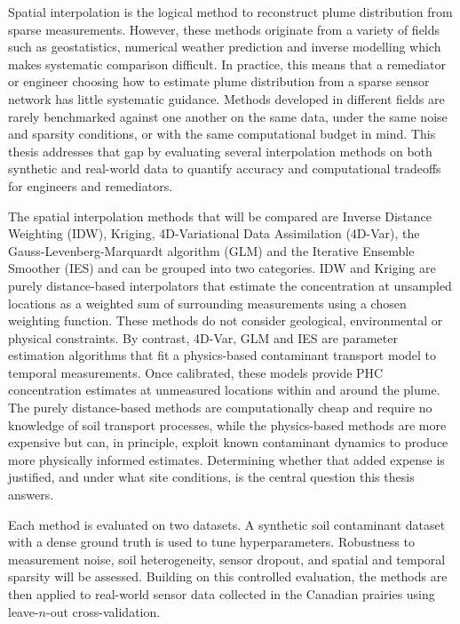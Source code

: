 Spatial interpolation is the logical method to reconstruct plume distribution from sparse measurements. However, these methods originate from a variety of fields such as geostatistics, numerical weather prediction and inverse modelling which makes systematic comparison difficult. In practice, this means that a remediator or engineer choosing how to estimate plume distribution from a sparse sensor network has little systematic guidance. Methods developed in different fields are rarely benchmarked against one another on the same data, under the same noise and sparsity conditions, or with the same computational budget in mind. This thesis addresses that gap by evaluating several interpolation methods on both synthetic and real-world data to quantify accuracy and computational tradeoffs for engineers and remediators.  

The spatial interpolation methods that will be compared are Inverse Distance Weighting (IDW), Kriging, 4D-Variational Data Assimilation (4D-Var), the Gauss-Levenberg-Marquardt algorithm (GLM) and the Iterative Ensemble Smoother (IES) and can be grouped into two categories. IDW and Kriging are purely distance-based interpolators that estimate the concentration at unsampled locations as a weighted sum of surrounding measurements using a chosen weighting function. These methods do not consider geological, environmental or physical constraints. By contrast, 4D-Var, GLM and IES are parameter estimation algorithms that fit a physics-based contaminant transport model to temporal measurements. Once calibrated, these models provide PHC concentration estimates at unmeasured locations within and around the plume. The purely distance-based methods are computationally cheap and require no knowledge of soil transport processes, while the physics-based methods are more expensive but can, in principle, exploit known contaminant dynamics to produce more physically informed estimates. Determining whether that added expense is justified, and under what site conditions, is the central question this thesis answers.

Each method is evaluated on two datasets. A synthetic soil contaminant dataset with a dense ground truth is used to tune hyperparameters. Robustness to measurement noise, soil heterogeneity, sensor dropout, and spatial and temporal sparsity will be assessed. Building on this controlled evaluation, the methods are then applied to real-world sensor data collected in the Canadian prairies using leave-$n$-out cross-validation.

